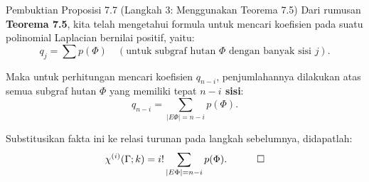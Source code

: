 ﻿\documentclass[aspectratio=169]{beamer}
\begin{document}
\begin{frame}{Pembuktian Proposisi 7.7 (Langkah 3: Menggunakan Teorema 7.5)}
  Dari rumusan \textbf{Teorema 7.5}, kita telah mengetahui formula untuk mencari koefisien pada suatu polinomial Laplacian bernilai positif, yaitu:
  $$ q_j = \sum p(\Phi) \quad (\text{untuk subgraf hutan } \Phi \text{ dengan banyak sisi } j). $$

  Maka untuk perhitungan mencari koefisien $q_{n-i}$, penjumlahannya dilakukan atas semua subgraf hutan $\Phi$ yang memiliki tepat \textbf{$n-i$ sisi}:
  $$ q_{n-i} = \sum_{|E\Phi| = n-i} p(\Phi). $$

  Substitusikan fakta ini ke relasi turunan pada langkah sebelumnya, didapatlah:
  $$ \chi^{(i)}(\Gamma; k) = i! \sum_{|E\Phi| = n-i} p(\Phi). \quad \qed $$
\end{frame}
\end{document}
